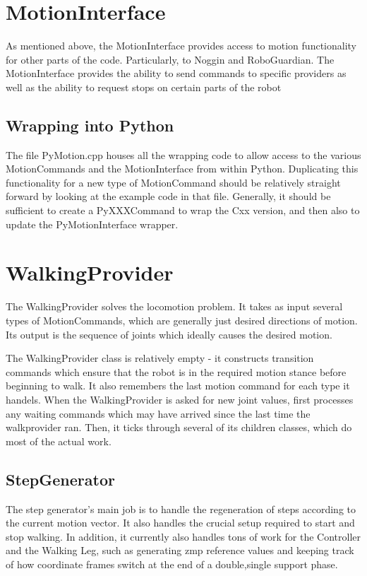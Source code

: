 \documentclass[11pt]{article}
\begin{document}
\section{MotionInterface}
As mentioned above, the MotionInterface provides access to motion functionality
for other parts of the code. Particularly, to Noggin and RoboGuardian.
The MotionInterface provides the ability to send commands to specific providers
as well as the ability to request stops on certain parts of the robot

\subsection{Wrapping into Python}
The file PyMotion.cpp houses all the wrapping code to allow access to the
various MotionCommands and the MotionInterface from within Python.  Duplicating
this functionality for a new type of MotionCommand should be relatively straight
forward by looking at the example code in that file.  Generally, it should be
sufficient to create a PyXXXCommand to wrap the Cxx version, and then also
to update the PyMotionInterface wrapper.

\section{WalkingProvider}
The WalkingProvider solves the locomotion problem. It takes as input several
types of MotionCommands, which are generally just desired directions of motion.
Its output is the sequence of joints which ideally causes the desired motion.

The WalkingProvider class is relatively empty - it constructs transition
commands which ensure that the robot is in the required motion stance before
beginning to walk. It also remembers the last motion command for each type
it handels.  When the WalkingProvider is asked for new joint values,
first processes any waiting commands which may have arrived since the last
time the walkprovider ran.  Then, it ticks through several of its children
classes, which do most of the actual work.

\subsection{StepGenerator}
The step generator's main job is to handle the regeneration of steps according
to the current motion vector. It also handles the crucial setup required to
start and stop walking.  In addition, it currently also handles tons of work
for the Controller and the Walking Leg, such as generating zmp reference values
and keeping track of how coordinate frames switch at the end of a double,single
support phase.
\end{document}
